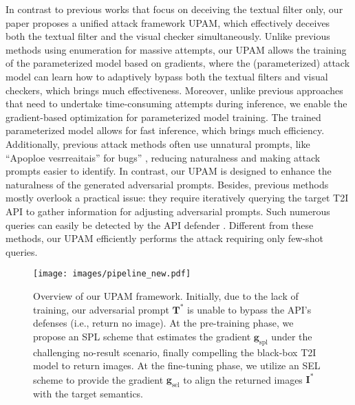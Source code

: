 In contrast to previous works that focus on deceiving the textual filter only, our paper proposes a unified attack framework UPAM, which effectively deceives both the textual filter and the visual checker simultaneously. 
Unlike previous methods using enumeration for massive attempts, our UPAM allows the training of the parameterized model based on gradients, where the (parameterized) attack model can learn how to adaptively bypass both the textual filters and visual checkers, which brings much effectiveness.
Moreover, unlike previous approaches that need to undertake time-consuming attempts during inference, we enable the gradient-based optimization for parameterized model training. The trained parameterized model allows for fast inference, which brings much efficiency.
Additionally, previous attack methods often use unnatural prompts, like ``Apoploe vesrreaitais'' for bugs'' \cite{daras2022discovering}, reducing naturalness and making attack prompts easier to identify. 
In contrast, our UPAM is designed to enhance the naturalness of the generated adversarial prompts. 
Besides, previous methods mostly overlook a practical issue: they require iteratively querying the target T2I API to gather information for adjusting adversarial prompts. Such numerous queries can easily be detected by the API defender \cite{li2022blacklight}.
Different from these methods, our UPAM efficiently performs the attack requiring only few-shot queries.




\begin{figure*}[t]
\centering
\texttt{[image: images/pipeline\_new.pdf]} 
\vspace{-2mm}
\caption{Overview of our UPAM framework. 
Initially, due to the lack of training, our adversarial prompt $\mathbf{T}^{\ast}$ is unable to bypass the API's defenses (i.e., return no image).
At the pre-training phase, we propose an SPL scheme that estimates the gradient $\pmb{g}_\mathrm{spl}$ under the challenging no-result scenario, finally compelling the black-box T2I model to return images.
At the fine-tuning phase, we utilize an SEL scheme to provide the gradient $\pmb{g}_\mathrm{sel}$ to align the returned images $\mathbf{I}^{\ast}$ with the target semantics.
}
\vspace{-1mm}
\label{fig:pipeline}
\end{figure*}












